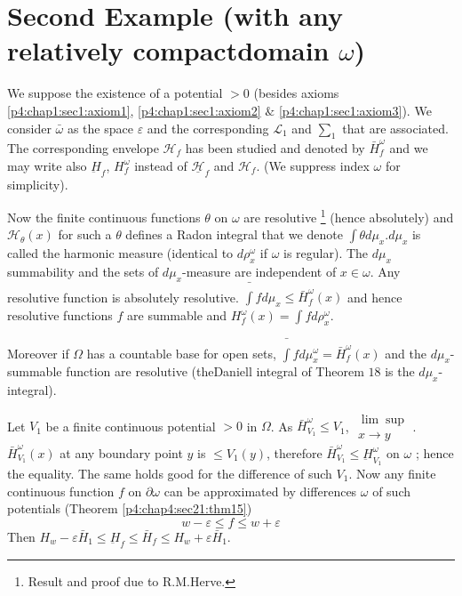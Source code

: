 \section[Second Example...]{Second Example (with any relatively compact\break domain $\omega$)}\label{p4:chap6:sec27}

\begin{thm}\label{p4:chap6:sec27:thm19}
  We suppose the existence of a potential $> 0$ (besides axioms
  \ref{p4:chap1:sec1:axiom1}, \ref{p4:chap1:sec1:axiom2} $\&$
  \ref{p4:chap1:sec1:axiom3}). We consider $\bar{\omega}$ as the space
  $\varepsilon$ and 
  the corresponding $\mathscr{L}_1$ and $\sum_1$ that are
  associated. The corresponding envelope $\mathscr{H}_f$ has been
  studied and denoted by $\bar{H}^\omega_f$ and we may write also
  $\underbar{H}_f$, $H^\omega_f$ instead of
  $\underline{\mathscr{H}}_f$ and $\mathscr{H}_f$. (We suppress index
  $\omega$ for simplicity). 
\end{thm}

Now the finite continuous functions $\theta$ on $\omega$ are
resolutive \footnote{Result and proof due to R.M.Herve.} (hence
absolutely) and $\mathscr{H}_\theta (x)$ for such a $\theta$ defines a
Radon integral that we denote $\int \theta d \mu_x.  d \mu_x$ is
called the harmonic measure (identical to $d \rho^\omega_x$ if
$\omega$ is regular). The $d \mu_x$ summability and the sets of $d
\mu_x$-measure are independent of $x \in \omega$. Any resolutive
function is absolutely resolutive. $\bar{\int} f d \mu_x \leq
\bar{H}^\omega_f (x)$ and hence resolutive functions $f$ are summable
and $H^\omega_f (x) = \int f d \rho^\omega_x$. 

Moreover if $\Omega$ has a countable base for open sets, $\bar{\int} f
d \mu^\omega_x = \bar{H}^\omega_f (x)$ and the $d \mu_x$-summable
function are resolutive (the\pageoriginale Daniell integral of Theorem $18$ is the
$d \mu_x$- integral). 

Let $V_1$ be a finite continuous potential $> 0$ in $\Omega$. As
$\bar{H}^\omega_{V_1} \leq V_1$, $\substack{\lim\sup\limits\\{x \to
y}}$. $\bar{H}^\omega_{V_1}(x)$ at any boundary point $y$ is
$\leq V_1 (y)$, therefore $\bar{H}^\omega_{V_1} \leq
\underbar{H}^\omega_{V_1}$ on $\omega$ ; hence the equality. The same
holds good for the difference of such $V_1$. Now any finite continuous
function $f$ on $\partial \omega$ can be approximated by differences
$\omega$ of such potentials (Theorem \ref{p4:chap4:sec21:thm15}) 
$$
w-\varepsilon \leq f \leq w + \varepsilon
$$ 
Then \qquad $H_w - \varepsilon \bar{H}_1 \leq \underbar{H}_f \leq
\bar{H}_f \leq H_w + \varepsilon \bar{H}_1$. 

